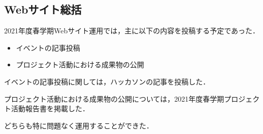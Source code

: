 \subsection*{Webサイト総括}


2021年度春学期Webサイト運用では，主に以下の内容を投稿する予定であった．

\begin{itemize}
\item イベントの記事投稿
\item プロジェクト活動における成果物の公開
\end{itemize}

イベントの記事投稿に関しては，ハッカソンの記事を投稿した．

プロジェクト活動における成果物の公開については，2021年度春学期プロジェクト活動報告書を掲載した．

どちらも特に問題なく運用することができた．
